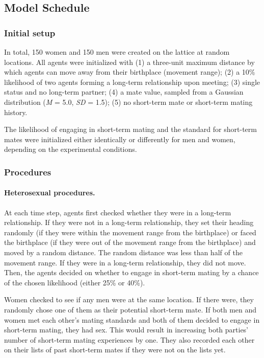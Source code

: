 \documentclass[
  11pt,
]{article}
\begin{document}
\hypertarget{model-schedule}{%
\subsection{Model Schedule}\label{model-schedule}}

\hypertarget{initial-setup}{%
\subsubsection{Initial setup}\label{initial-setup}}

In total, 150 women and 150 men were created on the lattice at random
locations. All agents were initialized with (1) a three-unit maximum
distance by which agents can move away from their birthplace (movement
range); (2) a 10\% likelihood of two agents forming a long-term
relationship upon meeting; (3) single status and no long-term partner;
(4) a mate value, sampled from a Gaussian distribution (\emph{M} = 5.0,
\emph{SD} = 1.5); (5) no short-term mate or short-term mating history.

The likelihood of engaging in short-term mating and the standard for
short-term mates were initialized either identically or differently for
men and women, depending on the experimental conditions.

\hypertarget{procedures}{%
\subsubsection{Procedures}\label{procedures}}

\hypertarget{heterosexual-procedures.}{%
\paragraph{Heterosexual procedures.}\label{heterosexual-procedures.}}

At each time step, agents first checked whether they were in a long-term
relationship. If they were not in a long-term relationship, they set
their heading randomly (if they were within the movement range from the
birthplace) or faced the birthplace (if they were out of the movement
range from the birthplace) and moved by a random distance. The random
distance was less than half of the movement range. If they were in a
long-term relationship, they did not move. Then, the agents decided on
whether to engage in short-term mating by a chance of the chosen
likelihood (either 25\% or 40\%).

Women checked to see if any men were at the same location. If there
were, they randomly chose one of them as their potential short-term
mate. If both men and women met each other's mating standards and both
of them decided to engage in short-term mating, they had sex. This would
result in increasing both parties' number of short-term mating
experiences by one. They also recorded each other on their lists of past
short-term mates if they were not on the lists yet.
\end{document}
